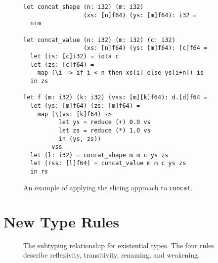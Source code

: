 \begin{figure}

\begin{lstlisting}
let concat_shape (n: i32) (m: i32)
                 (xs: [n]f64) (ys: [m]f64): i32 =
  n+m

let concat_value (n: i32) (m: i32) (c: i32)
                 (xs: [n]f64) (ys: [m]f64): [c]f64 =
  let (is: [c]i32) = iota c
  let (zs: [c]f64) =
    map (\i -> if i < n then xs[i] else ys[i+n]) is
  in zs

let f (m: i32) (k: i32) (vss: [m][k]f64): d.[d]f64 =
  let (ys: [m]f64) (zs: [m]f64) =
    map (\(vs: [k]f64) ->
          let ys = reduce (+) 0.0 vs
          let zs = reduce (*) 1.0 vs
          in (ys, zs))
        vss
  let (l: i32) = concat_shape m m c ys zs
  let (rss: [l]f64) = concat_value m m c ys zs
  in rs
\end{lstlisting}

  \caption{An example of applying the slicing approach to \lstinline{concat}.}
  \label{fig:FShapeSlice}
\end{figure}

\section{New Type Rules}
\label{sec:size-type-rules}

\begin{figure}





\caption{The subtyping relationship for existential types.  The four
  rules describe reflexivity, transitivity, renaming, and weakening.}
  \label{fig:ext-type-operations}
\end{figure}

